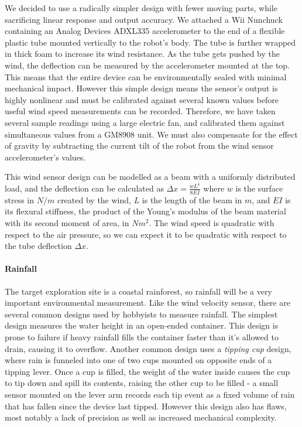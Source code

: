 \documentclass[12pt]{article}
\begin{document}
We decided to use a radically simpler design with fewer moving parts, while sacrificing linear response and output accuracy. We attached a Wii Nunchuck containing an Analog Devices \textsc{ADXL335} accelerometer to the end of a flexible plastic tube mounted vertically to the robot's body. The tube is further wrapped in thick foam to increase its wind resistance. As the tube gets pushed by the wind, the deflection can be measured by the accelerometer mounted at the top. This means that the entire device can be environmentally sealed with minimal mechanical impact. However this simple design means the sensor's output is highly nonlinear and must be calibrated against several known values before useful wind speed measurements can be recorded. Therefore, we have taken several sample readings using a large electric fan, and calibrated them against simultaneous values from a \textsc{GM8908} unit. We must also compensate for the effect of gravity by subtracting the current tilt of the robot from the wind sensor accelerometer's values.

This wind sensor design can be modelled as a beam with a uniformly distributed load, and the deflection can be calculated as $\Delta x = \frac{wL^4}{8EI}$ where $w$ is the surface stress in $N/m$ created by the wind, $L$ is the length of the beam in $m$, and $EI$ is its flexural stiffness, the product of the Young's modulus of the beam material with its second moment of area, in $Nm^2$. The wind speed is quadratic with respect to the air pressure, so we can expect it to be quadratic with respect to the tube deflection $\Delta x$.

{
    \scriptsize
    
}

    \paragraph*{Rainfall}
The target exploration site is a coastal rainforest, so rainfall will be a very important environmental measurement. Like the wind velocity sensor, there are several common designs used by hobbyists to measure rainfall. The simplest design measures the water height in an open-ended container. This design is prone to failure if heavy rainfall fills the container faster than it's allowed to drain, causing it to overflow. Another common design uses a \textit{tipping cup} design, where rain is funneled into one of two cups mounted on opposite ends of a tipping lever. Once a cup is filled, the weight of the water inside causes the cup to tip down and spill its contents, raising the other cup to be filled - a small sensor mounted on the lever arm records each tip event as a fixed volume of rain that has fallen since the device last tipped. However this design also has flaws, most notably a lack of precision as well as increased mechanical complexity.
\end{document}

